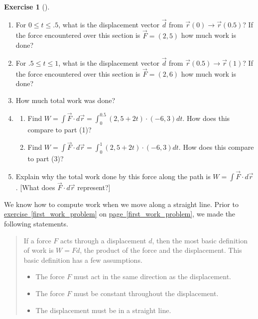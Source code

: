\documentclass[10pt,]{book}
\theoremstyle{plain}
\theoremstyle{definition}
\theoremstyle{definition}
\theoremstyle{definition}
\theoremstyle{definition}
\newtheorem{exploration}[project]{Exercise}
\theoremstyle{definition}
\numberwithin{equation}{section}
\newcommand{\ds}{\displaystyle}
\begin{document}
\begin{exploration}[]\label{exploration-189}
\leavevmode%
\begin{enumerate}[font=\bfseries,label=(\alph*),ref=\alph*]
\item\label{task-464} For \(0\leq t\leq .5\), what is the displacement vector \(\vec{d}\) from \(\vec{r}(0) \rightarrow \vec{r}(0.5)\)? If the force encountered over this section is \(\vec F = (2,5)\) how much work is done?%
\item\label{task-465} For \(.5\leq t\leq 1\), what is the displacement vector \(\vec{d}\) from \(\vec{r}(0.5) \rightarrow \vec{r}(1)\)? If the force encountered over this section is \(\vec F = (2,6)\) how much work is done?%
\item\label{task-466} How much total work was done?%
\item\label{task-467} \begin{enumerate}[font=\bfseries,label=(\roman*),ref=\theenumi.\roman*]
\item\label{task-468} Find \(\ds W=\int \vec F\cdot d\vec r = \int_0^{0.5} (2,5+2t)\cdot (-6,3)dt.\) How does this compare to part (1)?%
\item\label{task-469} Find \(\ds W=\int \vec F\cdot d\vec r = \int_0^1 (2,5+2t)\cdot (-6,3)dt.\) How does this compare to part (3)?%
\end{enumerate}
\item\label{task-470} Explain why the total work done by this force along the path is \(\ds W=\int \vec F\cdot d\vec r\). [What does \(\vec{F} \cdot d\vec{r}\) represent?]%
\end{enumerate}
\end{exploration}
We know how to compute work when we move along a straight line. Prior to \hyperref[first_work_problem]{exercise~\ref{first_work_problem}} on \hyperref[first_work_problem]{page~\ref{first_work_problem}}, we made the following statements.%
\begin{quote}\hypertarget{blockquote-5}{}
If a force \(F\) acts through a displacement \(d\), then the most basic definition of work is \(W=Fd\), the product of the force and the displacement.  This basic definition has a few assumptions. \leavevmode%
\begin{itemize}[label=\textbullet]
\item{}The force \(F\) must act in the same direction as the displacement.%
\item{}The force \(F\) must be constant throughout the  displacement.%
\item{}The displacement must be in a straight line.%
\end{itemize}
\end{quote}
\end{document}
